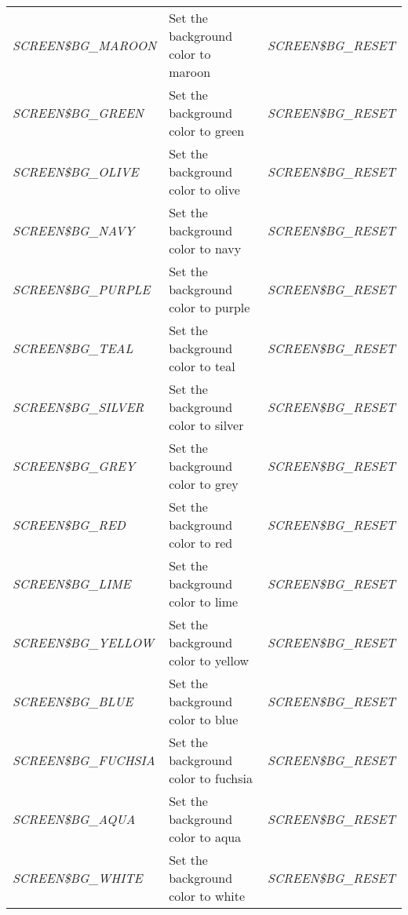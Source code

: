\documentclass[a4paper]{book}
\begin{document}
\begin{table}[h!tb]
\begin{minipage}[h!tb]{\textwidth}
\begin{tabular}{lp{60mm}l}
\scriptsize{\textsl{SCREEN{\$}BG{\_}MAROON} }           & Set the background color to maroon  & \scriptsize{\textsl{SCREEN{\$}BG{\_}RESET}} \\
\scriptsize{\textsl{SCREEN{\$}BG{\_}GREEN}  }           & Set the background color to green   & \scriptsize{\textsl{SCREEN{\$}BG{\_}RESET}} \\
\scriptsize{\textsl{SCREEN{\$}BG{\_}OLIVE}  }           & Set the background color to olive   & \scriptsize{\textsl{SCREEN{\$}BG{\_}RESET}} \\
\scriptsize{\textsl{SCREEN{\$}BG{\_}NAVY}   }           & Set the background color to navy    & \scriptsize{\textsl{SCREEN{\$}BG{\_}RESET}} \\
\scriptsize{\textsl{SCREEN{\$}BG{\_}PURPLE} }           & Set the background color to purple  & \scriptsize{\textsl{SCREEN{\$}BG{\_}RESET}} \\
\scriptsize{\textsl{SCREEN{\$}BG{\_}TEAL}   }           & Set the background color to teal    & \scriptsize{\textsl{SCREEN{\$}BG{\_}RESET}} \\
\scriptsize{\textsl{SCREEN{\$}BG{\_}SILVER} }           & Set the background color to silver  & \scriptsize{\textsl{SCREEN{\$}BG{\_}RESET}} \\
\scriptsize{\textsl{SCREEN{\$}BG{\_}GREY}   }           & Set the background color to grey    & \scriptsize{\textsl{SCREEN{\$}BG{\_}RESET}} \\
\scriptsize{\textsl{SCREEN{\$}BG{\_}RED}    }           & Set the background color to red	  & \scriptsize{\textsl{SCREEN{\$}BG{\_}RESET}} \\
\scriptsize{\textsl{SCREEN{\$}BG{\_}LIME}   }           & Set the background color to lime    & \scriptsize{\textsl{SCREEN{\$}BG{\_}RESET}} \\
\scriptsize{\textsl{SCREEN{\$}BG{\_}YELLOW} }           & Set the background color to yellow  & \scriptsize{\textsl{SCREEN{\$}BG{\_}RESET}} \\
\scriptsize{\textsl{SCREEN{\$}BG{\_}BLUE}   }           & Set the background color to blue    & \scriptsize{\textsl{SCREEN{\$}BG{\_}RESET}} \\
\scriptsize{\textsl{SCREEN{\$}BG{\_}FUCHSIA}}           & Set the background color to fuchsia & \scriptsize{\textsl{SCREEN{\$}BG{\_}RESET}} \\
\scriptsize{\textsl{SCREEN{\$}BG{\_}AQUA}   }           & Set the background color to aqua    & \scriptsize{\textsl{SCREEN{\$}BG{\_}RESET}} \\
\scriptsize{\textsl{SCREEN{\$}BG{\_}WHITE}  }           & Set the background color to white   & \scriptsize{\textsl{SCREEN{\$}BG{\_}RESET}} \\

\end{tabular}
\end{minipage}
\end{table}
\end{document}
